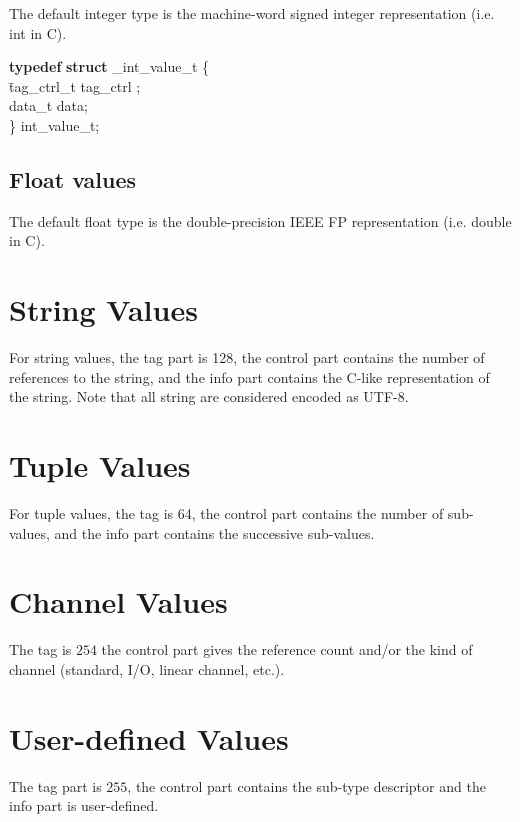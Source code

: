 \documentclass[a4paper,11pt]{article}
\newenvironment{program}{
  \begin{sffamily}
  \begin{scriptsize}
  \begin{tabbing}}
 {\end{tabbing}
  \end{scriptsize}
  \end{sffamily}}
\newcommand{\kw}[1]{\textsf{\textbf{#1}}}
\newcommand{\pindent}{\hspace{2em}\=}
\begin{document}
The default integer type is the machine-word signed integer representation (i.e. int in C).

\begin{program}
\kw{typedef} \kw{struct} \_int\_value\_t \{\\
\pindent tag\_ctrl\_t tag\_ctrl ; \\
\> data\_t data;\\
\} int\_value\_t;
\end{program}

\subsection{Float values}

The default float type is the double-precision IEEE FP representation (i.e. double in C).


\section{String Values}


For string values, the tag part is 128, the control part contains the number of
references to the string, and the info part contains the C-like representation of
 the string.   Note that all string are considered encoded as UTF-8.

\section{Tuple Values}

For tuple values, the tag is 64,  the control part contains the number of
sub-values, and the info part contains the successive sub-values.

\section{Channel Values}

The tag is $254$ the control part gives the reference count and/or the
kind of channel  (standard, I/O, linear channel, etc.).

\section{User-defined Values}

The tag part is $255$, the control part contains the sub-type descriptor
 and the info part is user-defined.
\end{document}
